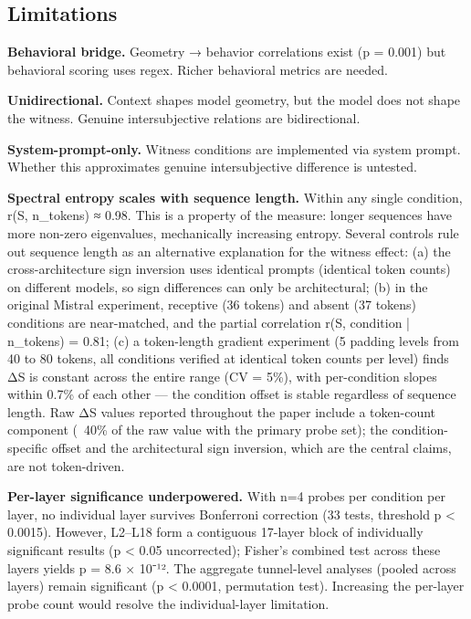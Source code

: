 \documentclass[12pt]{article}
\begin{document}
\subsection{Limitations}

\textbf{Behavioral bridge.} Geometry → behavior correlations exist (p = 0.001) but behavioral scoring uses regex. Richer behavioral metrics are needed.

\textbf{Unidirectional.} Context shapes model geometry, but the model does not shape the witness. Genuine intersubjective relations are bidirectional.

\textbf{System-prompt-only.} Witness conditions are implemented via system prompt. Whether this approximates genuine intersubjective difference is untested.

\textbf{Spectral entropy scales with sequence length.} Within any single condition, r(S, n\_tokens) ≈ 0.98. This is a property of the measure: longer sequences have more non-zero eigenvalues, mechanically increasing entropy. Several controls rule out sequence length as an alternative explanation for the witness effect: (a) the cross-architecture sign inversion uses identical prompts (identical token counts) on different models, so sign differences can only be architectural; (b) in the original Mistral experiment, receptive (36 tokens) and absent (37 tokens) conditions are near-matched, and the partial correlation r(S, condition | n\_tokens) = 0.81; (c) a token-length gradient experiment (5 padding levels from 40 to 80 tokens, all conditions verified at identical token counts per level) finds ΔS is constant across the entire range (CV = 5\%), with per-condition slopes within 0.7\% of each other — the condition offset is stable regardless of sequence length. Raw ΔS values reported throughout the paper include a token-count component (~40\% of the raw value with the primary probe set); the condition-specific offset and the architectural sign inversion, which are the central claims, are not token-driven.

\textbf{Per-layer significance underpowered.} With n=4 probes per condition per layer, no individual layer survives Bonferroni correction (33 tests, threshold p < 0.0015). However, L2–L18 form a contiguous 17-layer block of individually significant results (p < 0.05 uncorrected); Fisher's combined test across these layers yields p = 8.6 × 10⁻¹². The aggregate tunnel-level analyses (pooled across layers) remain significant (p < 0.0001, permutation test). Increasing the per-layer probe count would resolve the individual-layer limitation.
\end{document}
